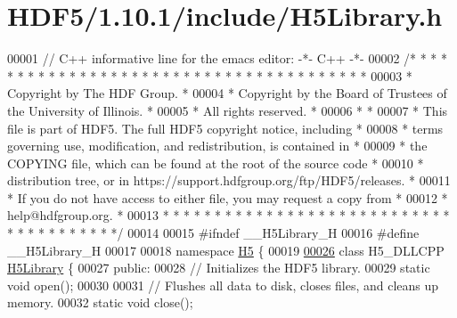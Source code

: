 \hypertarget{_h_d_f5_21_810_81_2include_2_h5_library_8h_source}{}\section{H\+D\+F5/1.10.1/include/\+H5\+Library.h}
\label{_h_d_f5_21_810_81_2include_2_h5_library_8h_source}

\begin{DoxyCode}
00001 \textcolor{comment}{// C++ informative line for the emacs editor: -*- C++ -*-}
00002 \textcolor{comment}{/* * * * * * * * * * * * * * * * * * * * * * * * * * * * * * * * * * * * * * *}
00003 \textcolor{comment}{ * Copyright by The HDF Group.                                               *}
00004 \textcolor{comment}{ * Copyright by the Board of Trustees of the University of Illinois.         *}
00005 \textcolor{comment}{ * All rights reserved.                                                      *}
00006 \textcolor{comment}{ *                                                                           *}
00007 \textcolor{comment}{ * This file is part of HDF5.  The full HDF5 copyright notice, including     *}
00008 \textcolor{comment}{ * terms governing use, modification, and redistribution, is contained in    *}
00009 \textcolor{comment}{ * the COPYING file, which can be found at the root of the source code       *}
00010 \textcolor{comment}{ * distribution tree, or in https://support.hdfgroup.org/ftp/HDF5/releases.  *}
00011 \textcolor{comment}{ * If you do not have access to either file, you may request a copy from     *}
00012 \textcolor{comment}{ * help@hdfgroup.org.                                                        *}
00013 \textcolor{comment}{ * * * * * * * * * * * * * * * * * * * * * * * * * * * * * * * * * * * * * * */}
00014 
00015 \textcolor{preprocessor}{#ifndef \_\_H5Library\_H}
00016 \textcolor{preprocessor}{#define \_\_H5Library\_H}
00017 
00018 \textcolor{keyword}{namespace }\hyperlink{namespace_h5}{H5} \{
00019 
\hyperlink{class_h5_1_1_h5_library}{00026} \textcolor{keyword}{class }H5\_DLLCPP \hyperlink{class_h5_1_1_h5_library}{H5Library} \{
00027    \textcolor{keyword}{public}:
00028         \textcolor{comment}{// Initializes the HDF5 library.}
00029         \textcolor{keyword}{static} \textcolor{keywordtype}{void} open();
00030 
00031         \textcolor{comment}{// Flushes all data to disk, closes files, and cleans up memory.}
00032         \textcolor{keyword}{static} \textcolor{keywordtype}{void} close();

\end{DoxyCode}
